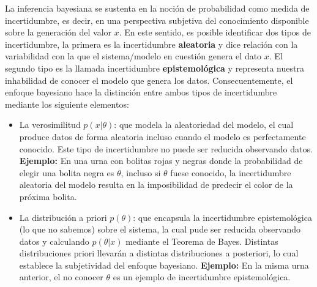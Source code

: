 La inferencia bayesiana se sustenta en la noción de probabilidad como  medida de incertidumbre, es decir, en una perspectiva subjetiva del conocimiento disponible sobre la generación del valor $x$. En este sentido, es posible identificar dos tipos de incertidumbre, la primera es la incertidumbre \textbf{aleatoria} y dice relación con la variabilidad con la que el sistema/modelo en cuestión genera el dato $x$. El segundo tipo es la llamada incertidumbre \textbf{epistemológica} y representa nuestra inhabilidad de conocer el modelo que genera los datos. Consecuentemente, el enfoque bayesiano hace la distinción entre ambos tipos de incertidumbre mediante los siguiente elementos:
\begin{itemize}
	\item La verosimilitud $p(x|\theta)$: que modela la aleatoriedad del modelo, el cual produce datos de forma aleatoria incluso cuando el modelo es perfectamente conocido. Este tipo de incertidumbre no puede ser reducida observando datos. \textbf{Ejemplo:} En una urna con bolitas rojas y negras donde la probabilidad de elegir una bolita negra es $\theta$, incluso si $\theta$ fuese conocido, la incertidumbre aleatoria del modelo resulta en la imposibilidad de predecir el color de la próxima bolita.   
	\item La distribución a priori $p(\theta)$: que encapsula la incertidumbre epistemológica (lo que no sabemos) sobre el sistema, la cual pude ser reducida observando datos y calculando $p(\theta|x)$ mediante el Teorema de Bayes. Distintas distribuciones priori llevarán a distintas distribuciones a posteriori, lo cual establece la subjetividad del enfoque bayesiano.  \textbf{Ejemplo:} En la misma urna anterior, el no conocer $\theta$ es un ejemplo de incertidumbre epistemológica.
\end{itemize}

